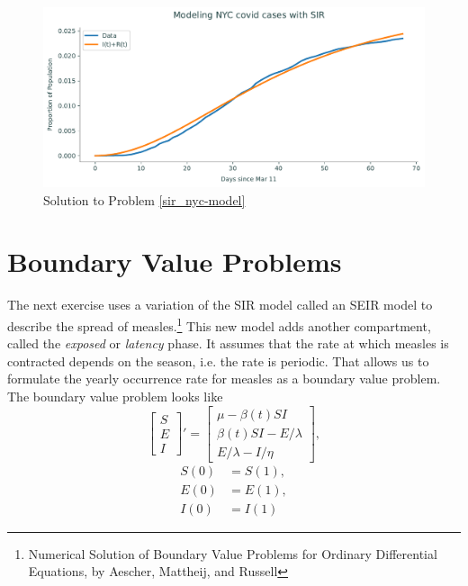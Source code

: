 \begin{figure}[H]
    \centering
    \includegraphics[width=\textwidth]{figures/PGED-model.pdf}
    \caption{Solution to Problem \ref{sir_nyc-model}}
    \label{nyc_ex}
\end{figure}



\section*{Boundary Value Problems}

The next exercise uses a variation of the SIR model called an SEIR model to describe the spread of measles.\footnote{Numerical Solution of Boundary Value Problems for Ordinary Differential Equations, by Aescher, Mattheij, and Russell}
This new model adds another compartment, called the \emph{exposed} or \emph{latency} phase.
It assumes that the rate at which measles is contracted depends on the season, i.e. the rate is periodic.
That allows us to formulate the yearly occurrence rate for measles as a boundary value problem.
The boundary value problem looks like
\begin{equation}\label{SEIR_BVP}
\left[\begin{array}{c}S \\ E \\ I\end{array}\right]' = \left[\begin{array}{c}\mu - \beta(t) S I \\\beta(t) SI - E/\lambda \\E/\lambda - I/\eta\end{array}\right],
\end{equation}
\begin{equation}\label{SEIR_BC}
    \begin{aligned}
        S(0) &= S(1),\\
        E(0) &= E(1),\\
        I(0) &= I(1)
    \end{aligned}
\end{equation}

